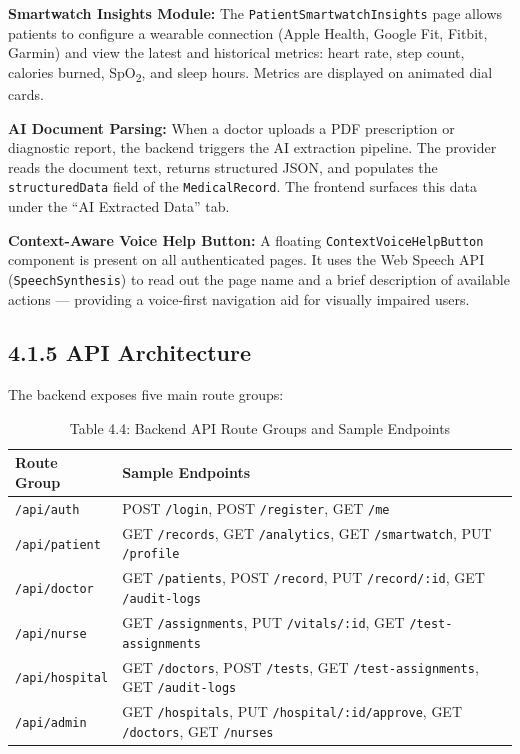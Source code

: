 \documentclass[12pt,a4paper]{report}
\begin{document}
\textbf{Smartwatch Insights Module:}
The \texttt{PatientSmartwatchInsights} page allows patients to configure a wearable connection (Apple Health, Google Fit, Fitbit, Garmin) and view the latest and historical metrics: heart rate, step count, calories burned, SpO\textsubscript{2}, and sleep hours. Metrics are displayed on animated dial cards.

\textbf{AI Document Parsing:}
When a doctor uploads a PDF prescription or diagnostic report, the backend triggers the AI extraction pipeline. The provider reads the document text, returns structured JSON, and populates the \texttt{structuredData} field of the \texttt{MedicalRecord}. The frontend surfaces this data under the ``AI Extracted Data'' tab.

\textbf{Context-Aware Voice Help Button:}
A floating \texttt{ContextVoiceHelpButton} component is present on all authenticated pages. It uses the Web Speech API (\texttt{SpeechSynthesis}) to read out the page name and a brief description of available actions — providing a voice-first navigation aid for visually impaired users.

\subsection{4.1.5 API Architecture}

The backend exposes five main route groups:

\begin{table}[H]
\centering
\caption{Table 4.4: Backend API Route Groups and Sample Endpoints}
\begin{tabular}{p{3cm}p{10cm}}
\toprule
\textbf{Route Group} & \textbf{Sample Endpoints} \\
\midrule
\texttt{/api/auth} & POST \texttt{/login}, POST \texttt{/register}, GET \texttt{/me} \\
\texttt{/api/patient} & GET \texttt{/records}, GET \texttt{/analytics}, GET \texttt{/smartwatch}, PUT \texttt{/profile} \\
\texttt{/api/doctor} & GET \texttt{/patients}, POST \texttt{/record}, PUT \texttt{/record/:id}, GET \texttt{/audit-logs} \\
\texttt{/api/nurse} & GET \texttt{/assignments}, PUT \texttt{/vitals/:id}, GET \texttt{/test-assignments} \\
\texttt{/api/hospital} & GET \texttt{/doctors}, POST \texttt{/tests}, GET \texttt{/test-assignments}, GET \texttt{/audit-logs} \\
\texttt{/api/admin} & GET \texttt{/hospitals}, PUT \texttt{/hospital/:id/approve}, GET \texttt{/doctors}, GET \texttt{/nurses} \\
\bottomrule
\end{tabular}
\end{table}
\end{document}

